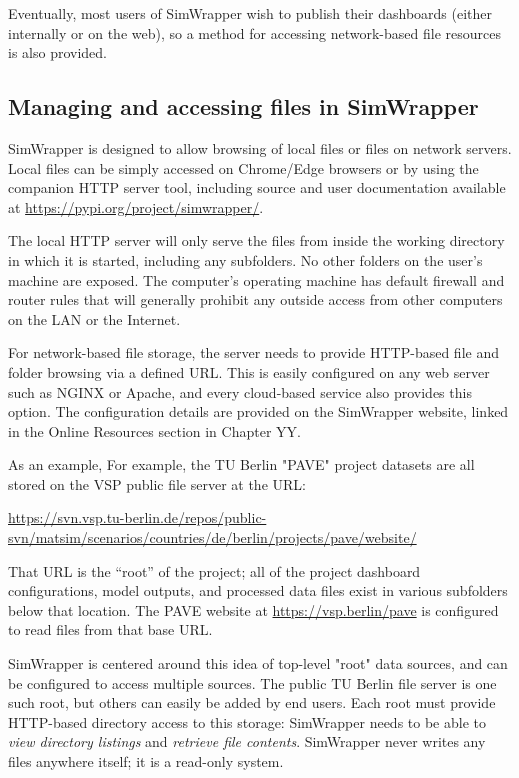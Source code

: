 \documentclass[3p,times,procedia]{elsarticle}
\begin{document}
Eventually, most users of SimWrapper wish to publish their dashboards (either internally or on the web), so a method for accessing network-based file resources is also provided.

\subsection{Managing and accessing files in SimWrapper}

SimWrapper is designed to allow browsing of local files or files on network servers. Local files can be simply accessed on Chrome/Edge browsers or by using the companion HTTP server tool, including source and user documentation available at \url{https://pypi.org/project/simwrapper/}.

The local HTTP server will only serve the files from inside the working directory in which it is started, including any subfolders. No other folders on the user's machine are exposed. The computer's operating machine has default firewall and router rules that will generally prohibit any outside access from other computers on the LAN or the Internet.

For network-based file storage, the server needs to provide HTTP-based file and folder browsing via a defined URL. This is easily configured on any web server such as NGINX or Apache, and every cloud-based service also provides this option. The configuration details are provided on the SimWrapper website, linked in the Online Resources section in Chapter YY.

As an example, For example, the TU Berlin "PAVE" project datasets are all stored on the VSP public file server at the URL:

\url{https://svn.vsp.tu-berlin.de/repos/public-svn/matsim/scenarios/countries/de/berlin/projects/pave/website/}

That URL is the ``root'' of the project; all of the project dashboard configurations, model outputs, and processed data files exist in various subfolders below that location. The PAVE website at \url{https://vsp.berlin/pave} is configured to read files from that base URL.

SimWrapper is centered around this idea of top-level "root" data sources, and can be configured to access multiple sources. The public TU Berlin file server is one such root, but others can easily be added by end users. Each root must provide HTTP-based directory access to this storage: SimWrapper needs to be able to \emph{view directory listings} and \emph{retrieve file contents}. SimWrapper never writes any files anywhere itself; it is a read-only system.
\end{document}
